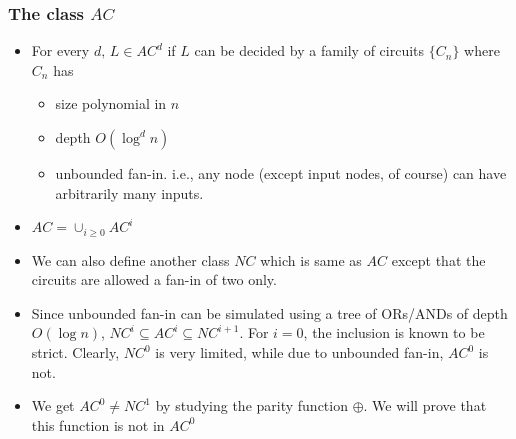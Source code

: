 \documentclass{beamer}[11pt]
\begin{document}

\begin{frame}
\frametitle{The class $AC$}
\begin{itemize}
 \item For every $d,\, L\in AC^d $ if $L$ can be decided by a family of circuits $\{C_n\}$ where $C_n$ has
 \begin{itemize}
  \item size polynomial in $n$
  \item depth $O(\log^d n) $
  \item unbounded fan-in. i.e., any node (except input nodes, of course) can have arbitrarily many inputs.
 \end{itemize}
 \item $AC = \cup_{i\geq 0}AC^i $
 \item We can also define another class $NC$ which is same as $AC$ except that the circuits are allowed a fan-in of two only.
 \pause\item Since unbounded fan-in can be simulated using a tree of ORs/ANDs of depth $O(\log n)$, $NC^i\subseteq AC^i \subseteq NC^{i+1} $. For $i=0$, the inclusion is known to be strict. Clearly, $NC^0$ is very limited, while due to unbounded fan-in, $AC^0$ is not.
 \item We get $AC^0 \neq NC^1$ by studying the parity function $\oplus$. We will prove that this function is not in $AC^0$
\end{itemize}

\end{frame}


\end{document}
